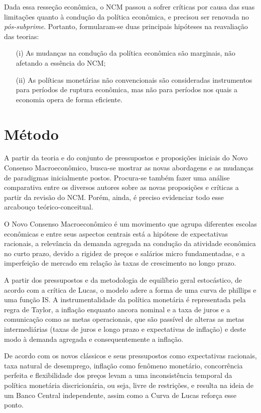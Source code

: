 \documentclass[report]{uftex}
\begin{document}
Dada essa resseção econômica, o NCM passou a sofrer críticas por causa das suas limitações quanto à condução da política econômica, e precisou ser renovada no \textit{pós-subprime}. Portanto, formularam-se duas principais hipóteses na reavaliação das teorias:

\begin{itemize}
\item[(i)] As mudanças na condução da política econômica são marginais, não afetando a essência do NCM;

\item[(ii)] As políticas monetárias não  convencionais são consideradas instrumentos para períodos de ruptura econômica, mas não para períodos nos quais a economia opera de forma eficiente. 	
\end{itemize}

\section{Método}

A partir da teoria e do conjunto de pressupostos e proposições iniciais do Novo Consenso Macroeconômico, busca-se mostrar as novas abordagens e as mudanças de paradigmas inicialmente postos. Procura-se também fazer uma análise comparativa entre os diversos autores sobre as novas proposições e críticas a partir da revisão do NCM. Porém, ainda, é preciso evidenciar todo esse arcabouço teórico-conceitual. 

O Novo Consenso Macroeconômico é um movimento que agrupa diferentes escolas econômicas e entre seus aspectos centrais está a hipótese de expectativas racionais, a relevância da demanda agregada na condução da atividade econômica no curto prazo, devido a rigidez de preços e salários micro fundamentadas, e a imperfeição de mercado em relação às taxas de crescimento no longo prazo. 

A partir dos pressupostos e da metodologia de equilíbrio geral estocástico, de acordo com a crítica de Lucas, o modelo adere a forma de uma curva de phillips e uma função IS. A instrumentalidade da política monetária é representada pela regra de Taylor, a inflação enquanto ancora nominal e a taxa de juros e a comunicação como as metas operacionais, que são passível de alteras as metas intermediárias (taxas de juros e longo prazo e expectativas de inflação) e deste modo à demanda agregada e consequentemente a inflação. 

De acordo com os novos clássicos e seus pressupostos como expectativas racionais, taxa natural de desemprego, inflação como fenômeno monetário, concorrência perfeita e flexibilidade dos preços levam a uma inconsistência temporal da política monetária discricionária, ou seja, livre de restrições, e resulta na ideia de um Banco Central independente, assim como a Curva de Lucas reforça esse ponto.
\end{document}
